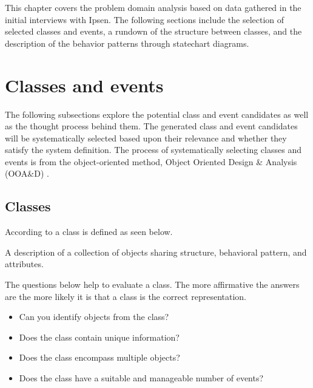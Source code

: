 This chapter covers the problem domain analysis based on data gathered in the initial interviews with Ipsen.
The following sections include the selection of selected classes and events, a rundown of the structure between classes, and the description of the behavior patterns through statechart diagrams.

\section{Classes and events}
The following subsections explore the potential class and event candidates as well as the thought process behind them.
The generated class and event candidates will be systematically selected based upon their relevance and whether they satisfy the system definition.
The process of systematically selecting classes and events is
from
the object-oriented method, Object Oriented Design \& Analysis (OOA\&D) \cite{Rod-Aalborg} .

\subsection{Classes} \label{sec:Classes}
According to  \citep[p.~55]{Rod-Aalborg} a class is defined as seen below.
\begin{defn}\label{defn:class}
	A description of a collection of objects sharing structure, behavioral pattern, and attributes.	
\end{defn}

The questions below help to evaluate a class. The more affirmative the answers are the more likely it is that a class is the correct representation. \citep[p.~62]{Rod-Aalborg}
\begin{itemize}
	\item Can you identify objects from the class?
	\item Does the class contain unique information?
	\item Does the class encompass multiple objects?
	\item Does the class have a suitable and manageable number of events?
\end{itemize}

